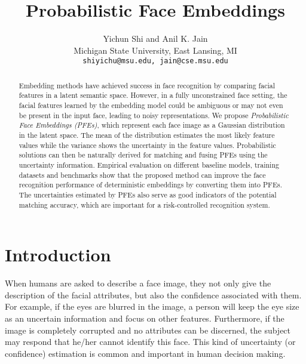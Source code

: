 \documentclass[10pt,twocolumn,letterpaper]{article}
\begin{document}
\title{Probabilistic Face Embeddings}


\author{
    Yichun Shi\; and\; Anil K. Jain\\
    Michigan State University, East Lansing, MI\\
{\tt\small shiyichu@msu.edu, jain@cse.msu.edu}
}

\maketitle



\begin{abstract}
   Embedding methods have achieved success in face recognition by comparing facial features in a latent semantic space. However, in a fully unconstrained face setting, the facial features learned by the embedding model could be ambiguous or may not even be present in the input face, leading to noisy representations. We propose \textit{Probabilistic Face Embeddings (PFEs)}, which represent each face image as a Gaussian distribution in the latent space. The mean of the distribution estimates the most likely feature values while the variance shows the uncertainty in the feature values. Probabilistic solutions can then be naturally derived for matching and fusing PFEs using the uncertainty information. Empirical evaluation on different baseline models, training datasets and benchmarks show that the proposed method can improve the face recognition performance of deterministic embeddings by converting them into PFEs. The uncertainties estimated by PFEs also serve as good indicators of the potential matching accuracy, which are important for a risk-controlled recognition system.
\end{abstract}

\vspace{-1.0em}\section{Introduction}



When humans are asked to describe a face image, they not only give the description of the facial attributes, but also the confidence associated with them. For example, if the eyes are blurred in the image, a person will keep the eye size as an uncertain information and focus on other features. Furthermore, if the image is completely corrupted and no attributes can be discerned, the subject may respond that he/her cannot identify this face. This kind of uncertainty (or confidence) estimation is common and important in human decision making.
\end{document}
